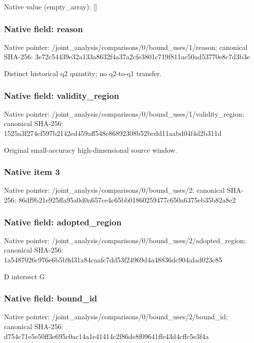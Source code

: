 \documentclass[10pt,a4paper]{article}
\begin{document}
Native value (empty\_\allowbreak{}array): []

\subsubsection{Native field: reason}
Native pointer: /joint\_\allowbreak{}analysis/comparisons/0/bound\_\allowbreak{}uses/1/reason; canonical SHA-256: 3e72c54439e32a133a8632f4a37a2cfe3801c719f811ac50ad53770e8c7d3b3e

\begingroup\raggedright\sloppy Distinct historical q2 quantity;\allowbreak{} no q2-to-q1 transfer.\par\endgroup

\subsubsection{Native field: validity\_\allowbreak{}region}
Native pointer: /joint\_\allowbreak{}analysis/comparisons/0/bound\_\allowbreak{}uses/1/validity\_\allowbreak{}region; canonical SHA-256: 1525a3f274cf597b2142ed459aff548e86892308b52bcdd11aabd04f4d2b311d

\begingroup\raggedright\sloppy Original small-accuracy high-dimensional source window.\par\endgroup

\subsubsection{Native item 3}
Native pointer: /joint\_\allowbreak{}analysis/comparisons/0/bound\_\allowbreak{}uses/2; canonical SHA-256: 86df9b21e925ffa95a0d0a657ce4c65bb01860259477c650a6375eb35b82a8e2

\subsubsection{Native field: adopted\_\allowbreak{}region}
Native pointer: /joint\_\allowbreak{}analysis/comparisons/0/bound\_\allowbreak{}uses/2/adopted\_\allowbreak{}region; canonical SHA-256: 1a5487026c976e6b5b9d31a84caafc7dd53f24969d4a48836dc904afad023c85

\begingroup\raggedright\sloppy D intersect G\par\endgroup

\subsubsection{Native field: bound\_\allowbreak{}id}
Native pointer: /joint\_\allowbreak{}analysis/comparisons/0/bound\_\allowbreak{}uses/2/bound\_\allowbreak{}id; canonical SHA-256: d754c71e5e50ff3e695c0ac14a1e41414c2f86de8f09641ffe43d4cffc5e3f4a
\end{document}
